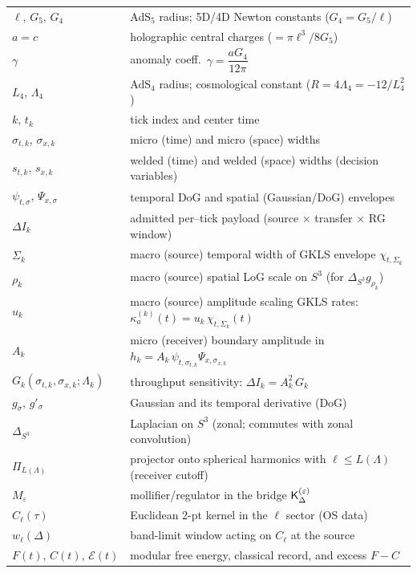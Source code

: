 \documentclass[10pt]{article}
\theoremstyle{definition}
\theoremstyle{plain}
\begin{document}
\begin{center}
\begin{tabular}{@{}ll@{}}
$\ell$, $G_5$, $G_4$ & AdS$_5$ radius; 5D/4D Newton constants ($G_4=G_5/\ell$) \\
$a=c$ & holographic central charges ($=\pi\ell^3/8G_5$) \\
$\gamma$ & anomaly coeff.\ $\gamma=\dfrac{aG_4}{12\pi}$ \\
$L_4$, $\Lambda_4$ & AdS$_4$ radius; cosmological constant ($R=4\Lambda_4=-12/L_4^2$) \\
$k$, $t_k$ & tick index and center time \\
$\sigma_{t,k}$, $\sigma_{x,k}$ & micro (time) and micro (space) widths \\
$s_{t,k}$, $s_{x,k}$ & welded (time) and welded (space) widths (decision variables) \\
$\psi_{t,\sigma}$, $\Psi_{x,\sigma}$ & temporal DoG and spatial (Gaussian/DoG) envelopes \\
$\Delta I_k$ & admitted per--tick payload (source $\times$ transfer $\times$ RG window) \\
\(\Sigma_k\) & macro (source) temporal width of GKLS envelope \(\chi_{t,\Sigma_k}\) \\
\(\rho_k\) & macro (source) spatial LoG scale on \(S^3\) (for \(\Delta_{S^3} g_{\rho_k}\)) \\
\(u_k\) & macro (source) amplitude scaling GKLS rates: \(\kappa_a^{(k)}(t)=u_k\,\chi_{t,\Sigma_k}(t)\) \\
\(A_k\) & micro (receiver) boundary amplitude in \(h_k=A_k\,\psi_{t,\sigma_{t,k}}\Psi_{x,\sigma_{x,k}}\) \\
\(G_k(\sigma_{t,k},\sigma_{x,k};\Lambda_k)\) & throughput sensitivity: \(\Delta I_k=A_k^2\,G_k\) \\
\(g_\sigma,\,g'_\sigma\) & Gaussian and its temporal derivative (DoG) \\
\(\Delta_{S^3}\) & Laplacian on \(S^3\) (zonal; commutes with zonal convolution) \\
\(\Pi_{L(\Lambda)}\) & projector onto spherical harmonics with \(\ell\le L(\Lambda)\) (receiver cutoff) \\
\(M_\varepsilon\) & mollifier/regulator in the bridge \({\sf K}_\Delta^{(\varepsilon)}\) \\
\(C_\ell(\tau)\) & Euclidean 2-pt kernel in the \(\ell\) sector (OS data) \\
\(w_\ell(\Delta)\) & band-limit window acting on \(C_\ell\) at the source \\
\(F(t),\,C(t),\,\mathcal E(t)\) & modular free energy, classical record, and excess \(F-C\) \\

\end{tabular}
\end{center}
\end{document}

